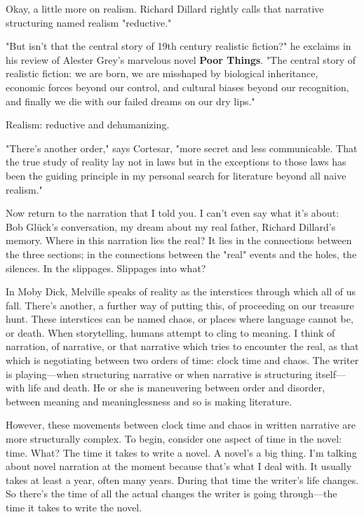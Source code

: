 Okay, a little more on realism. Richard Dillard rightly calls that
narrative structuring named realism "reductive."

"But isn't that the central story of 19th century realistic fiction?" he
exclaims in his review of Alester Grey's marvelous novel \textbf{Poor
Things}. "The central story of realistic fiction: we are born, we are
misshaped by biological inheritance, economic forces beyond our control,
and cultural biases beyond our recognition, and finally we die with our
failed dreams on our dry lips."

Realism: reductive and dehumanizing.

"There's another order," says Cortesar, "more secret and less
communicable. That the true study of reality lay not in laws but in the
exceptions to those laws has been the guiding principle in my personal
search for literature beyond all naive realism."

Now return to the narration that I told you. I can't even say what it's
about: Bob Glück's conversation, my dream about my real father, Richard
Dillard's memory. Where in this narration lies the real? It lies in the
connections between the three sections; in the connections between the
"real" events and the holes, the silences. In the slippages. Slippages
into what?

In Moby Dick, Melville speaks of reality as the interstices through
which all of us fall. There's another, a further way of putting this, of
proceeding on our treasure hunt. These interstices can be named chaos,
or places where language cannot be, or death. When storytelling, humans
attempt to cling to meaning. I think of narration, of narrative, or that
narrative which tries to encounter the real, as that which is
negotiating between two orders of time: clock time and chaos. The writer
is playing---when structuring narrative or when narrative is structuring
itself---with life and death. He or she is maneuvering between order and
disorder, between meaning and meaninglessness and so is making
literature.

However, these movements between clock time and chaos in written
narrative are more structurally complex. To begin, consider one aspect
of time in the novel: time. What? The time it takes to write a novel. A
novel's a big thing. I'm talking about novel narration at the moment
because that's what I deal with. It usually takes at least a year, often
many years. During that time the writer's life changes. So there's the
time of all the actual changes the writer is going through---the time it
takes to write the novel.

